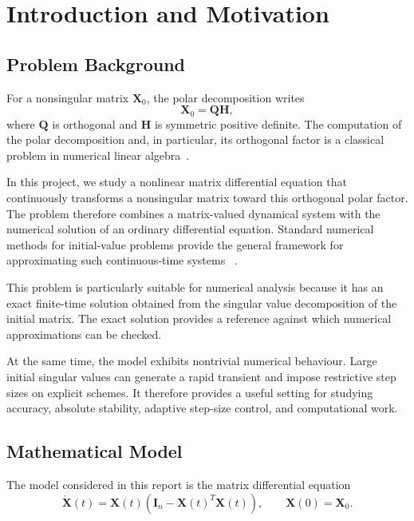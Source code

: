 \section{Introduction and Motivation}

\subsection{Problem Background}

For a nonsingular matrix $\mathbf{X}_0$, the polar decomposition writes
\[
\mathbf{X}_0 = \mathbf{Q}\mathbf{H},
\]
where $\mathbf{Q}$ is orthogonal and $\mathbf{H}$ is symmetric positive
definite. The computation of the polar decomposition and, in particular,
its orthogonal factor is a classical problem in numerical linear
algebra~\cite{higham1986}.

In this project, we study a nonlinear matrix differential equation that
continuously transforms a nonsingular matrix toward this orthogonal
polar factor. The problem therefore combines a matrix-valued dynamical
system with the numerical solution of an ordinary differential equation.
Standard numerical methods for initial-value problems provide the
general framework for approximating such continuous-time systems
~\cite{hairer1993}.

This problem is particularly suitable for numerical analysis because it
has an exact finite-time solution obtained from the singular value
decomposition of the initial matrix. The exact solution provides a
reference against which numerical approximations can be checked.

At the same time, the model exhibits nontrivial numerical behaviour.
Large initial singular values can generate a rapid transient and impose
restrictive step sizes on explicit schemes. It therefore provides a
useful setting for studying accuracy, absolute stability, adaptive
step-size control, and computational work.

\subsection{Mathematical Model}

The model considered in this report is the matrix differential equation
\begin{equation}
\label{eq:background_matrix_flow}
\dot{\mathbf{X}}(t)
=
\mathbf{X}(t)
\left(
\mathbf{I}_n-\mathbf{X}(t)^T\mathbf{X}(t)
\right),
\qquad
\mathbf{X}(0)=\mathbf{X}_0.
\end{equation}

